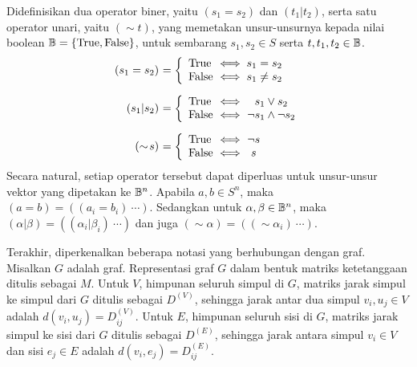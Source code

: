 Didefinisikan dua operator biner, yaitu \((s_1 = s_2)\) dan \((t_1 | t_2)\), serta satu operator unari, yaitu \((\sim\!t)\), yang memetakan unsur-unsurnya kepada nilai boolean \(\Bbb = \{\True, \False\}\), untuk sembarang \(s_1, s_2 \in S\) serta \(t, t_1, t_2 \in \Bbb\).
\[
\begin{array}{r@{\ }l}
	(s_1 = s_2) &= \left\{
		\begin{array}{l@{\ }l}
			\True  &\iff s_1 = s_2 \\
			\False &\iff s_1 \neq s_2
		\end{array} \right. \\ [16pt]
	(s_1 | s_2) &= \left\{
		\begin{array}{l@{\ }l@{\ }c}
			\True  &\iff& s_1 \vee s_2 \\
			\False &\iff& \neg s_1 \wedge \neg s_2
		\end{array} \right. \\ [16pt]
	(\sim\!s) &= \left\{
		\begin{array}{l@{\ }l@{\ }c}
			\True  &\iff& \neg s \\
			\False &\iff& s
		\end{array} \right.
\end{array}
\]
Secara natural, setiap operator tersebut dapat diperluas untuk unsur-unsur vektor yang dipetakan ke \(\Bbb^n\). Apabila \(a, b \in S^n\), maka \((a = b) = ((a_i = b_i)\ \cdots)\). Sedangkan untuk \(\alpha, \beta \in \Bbb^n\), maka \((\alpha | \beta) = ((\alpha_i | \beta_i)\ \cdots)\) dan juga \((\sim\!\alpha) = ((\sim\!\alpha_i)\ \cdots)\).

Terakhir, diperkenalkan beberapa notasi yang berhubungan dengan graf. Misalkan \(G\) adalah graf. Representasi graf \(G\) dalam bentuk matriks ketetanggaan ditulis sebagai \(M\). Untuk \(V\), himpunan seluruh simpul di \(G\), matriks jarak simpul ke simpul dari \(G\) ditulis sebagai \(D^{(V)}\), sehingga jarak antar dua simpul \(v_i,u_j \in V\) adalah \(d(v_i,u_j) = D^{(V)}_{ij}\). Untuk \(E\), himpunan seluruh sisi di \(G\), matriks jarak simpul ke sisi dari \(G\) ditulis sebagai \(D^{(E)}\), sehingga jarak antara simpul \(v_i \in V\) dan sisi \(e_j \in E\) adalah \(d(v_i,e_j) = D^{(E)}_{ij}\).
